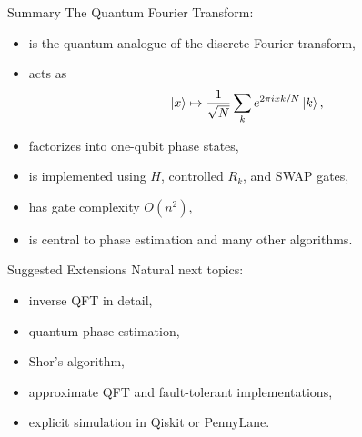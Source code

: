 \documentclass{beamer}
\begin{document}
\begin{frame}{Summary}
The Quantum Fourier Transform:
\begin{itemize}
\item is the quantum analogue of the discrete Fourier transform,
\item acts as
\[
\ket{x}\mapsto \frac{1}{\sqrt N}\sum_k e^{2\pi i xk/N}\ket{k},
\]
\item factorizes into one-qubit phase states,
\item is implemented using \(H\), controlled \(R_k\), and SWAP gates,
\item has gate complexity \(O(n^2)\),
\item is central to phase estimation and many other algorithms.
\end{itemize}
\end{frame}

\begin{frame}{Suggested Extensions}
Natural next topics:
\begin{itemize}
\item inverse QFT in detail,
\item quantum phase estimation,
\item Shor's algorithm,
\item approximate QFT and fault-tolerant implementations,
\item explicit simulation in Qiskit or PennyLane.
\end{itemize}
\end{frame}
\end{document}
